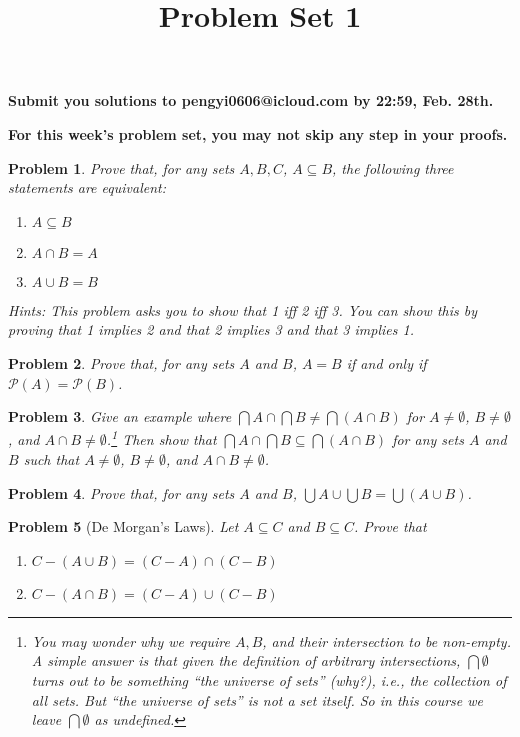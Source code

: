 \documentclass[11pt]{article}
\title{Problem Set 1}
\newtheorem{problem}{Problem}
\begin{document}
	\maketitle
	\begin{center}
		\begin{framed}
			\textbf{Submit you solutions to pengyi0606@icloud.com by 22:59, Feb. 28th.}
		\end{framed}
		\begin{framed}
			\textbf{For this week's problem set, you may not skip any step in your proofs.}
		\end{framed}
	\end{center}
\begin{problem}
	Prove that, for any sets $A,B,C$, $A \subseteq B$, the following three statements are equivalent:
	\begin{enumerate}
		\item $A\subseteq B$
		\item $A\cap B=A$
		\item $A\cup B=B$
	\end{enumerate}
Hints: This problem asks you to show that 1 iff 2 iff 3. You can show this by proving that 1 implies 2 and that 2 implies 3 and that 3 implies 1.
\end{problem}
\begin{problem}
	Prove that, for any sets $A$ and $B$, $A = B$ if and only if $\mathcal{P}(A)=\mathcal{P}(B)$.
\end{problem}
\begin{problem}
	Give an example where $\bigcap A \cap \bigcap B \neq \bigcap(A\cap B)$ for $A\neq\emptyset$, $B\neq \emptyset$, and $A\cap B\neq\emptyset$.\footnote{You may wonder why we require $A,B$, and their intersection to be non-empty. A simple answer is that given the definition of arbitrary intersections, $\bigcap \emptyset$ turns out to be something ``the universe of sets'' (why?), i.e., the collection of all sets. But ``the universe of sets'' is not a set itself. So in this course we leave $\bigcap \emptyset$ as undefined.} Then show that $\bigcap A \cap \bigcap B \subseteq \bigcap(A\cap B)$ for any sets $A$ and $B$ such that $A\neq\emptyset$, $B\neq \emptyset$, and $A\cap B\neq\emptyset$.
\end{problem}
\begin{problem}
	Prove that, for any sets $A$ and $B$, $\bigcup A \cup \bigcup B = \bigcup(A\cup B)$.
\end{problem}
\begin{problem}[De Morgan's Laws]
Let $A\subseteq C$ and $B\subseteq C$. Prove that
\begin{enumerate}
	\item $C-(A\cup B)= (C-A)\cap(C-B)$
	\item $C-(A\cap B)= (C-A)\cup(C-B)$
\end{enumerate}
\end{problem}
\end{document}
